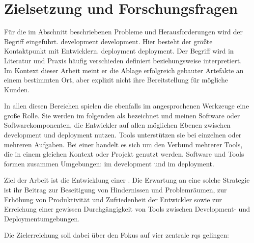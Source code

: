 \section{Zielsetzung und Forschungsfragen}
\label{sec:01-03_objectives-and-research-questions}

Für die im Abschnitt  beschriebenen Probleme und Herausforderungen wird der Begriff  eingeführt. \Gls{development} \glsdesc{development}. Hier besteht der größte Kontaktpunkt mit Entwicklern. \Gls{deployment} \glsdesc{deployment}. Der Begriff wird in Literatur und Praxis häufig verschieden definiert beziehungsweise interpretiert. Im Kontext dieser Arbeit meint er die Ablage erfolgreich gebauter Artefakte an einem bestimmten Ort, aber explizit nicht ihre Bereitstellung für mögliche Kunden.

In allen diesen Bereichen spielen die ebenfalls im  angesprochenen Werkzeuge eine große Rolle. Sie werden im folgenden als  bezeichnet und meinen Software oder Softwarekomponenten, die Entwickler auf allen möglichen Ebenen zwischen \Gls{development} und \Gls{deployment} nutzen. Tools unterstützen sie bei einzelnen oder mehreren Aufgaben. Bei einer  handelt es sich um den Verbund mehrerer Tools, die in einem gleichen Kontext oder Projekt genutzt werden. Software und Tools formen zusammen Umgebungen:  im \Gls{development} und  im \Gls{deployment}.

Ziel der Arbeit ist die Entwicklung einer . Die Erwartung an eine solche Strategie ist ihr Beitrag zur Beseitigung von Hindernissen und Problemräumen, zur Erhöhung von Produktivität und Zufriedenheit der Entwickler sowie zur Erreichung einer gewissen Durchgängigkeit von Tools zwischen Development- und Deploymentumgebungen.

Die Zielerreichung soll dabei über den Fokus auf vier zentrale \Glspl{rq} gelingen:


